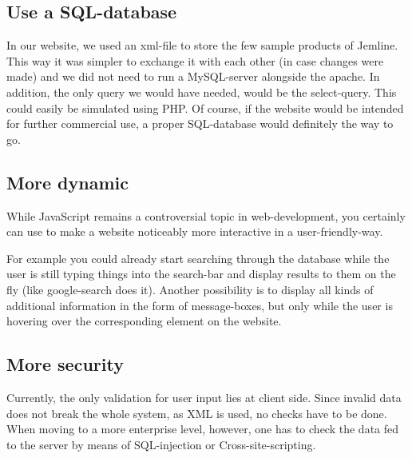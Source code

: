 \documentclass{scrartcl}
\begin{document}
\subsection{Use a SQL-database}
In our website, we used an xml-file to store the few sample products of Jemline.
This way it was simpler to exchange it with each other (in case changes were made) and we did not need to run a MySQL-server alongside the apache. In addition, the only query we would have needed, would be the select-query. This could easily be simulated using PHP. Of course, if the website would be intended for further commercial use, a proper SQL-database would definitely the way to go.

\subsection{More dynamic}
While JavaScript remains a controversial topic in web-development, you certainly can use to make a website noticeably more interactive in a user-friendly-way.

For example you could already start searching through the database while the user is still typing things into the search-bar and display results to them on the fly (like google-search does it). Another possibility is to display all kinds of additional information in the form of message-boxes, but only while the user is hovering over the corresponding element on the website.

\subsection{More security}
Currently, the only validation for user input lies at client side. Since invalid data does not break the whole system, as XML is used, no checks have to be done. When moving to a more enterprise level, however, one has to check the data fed to the server by means of SQL-injection or Cross-site-scripting.
\end{document}
